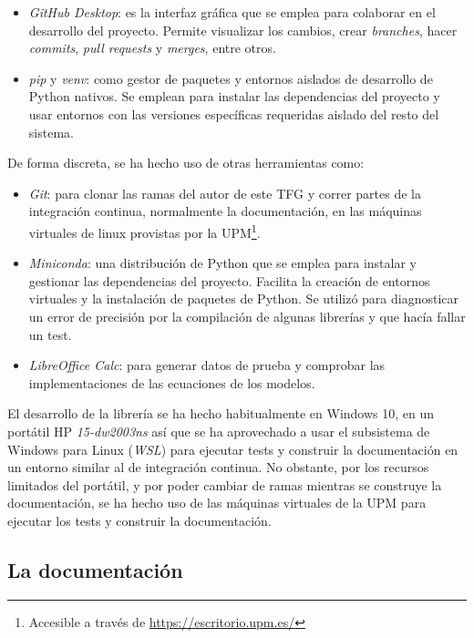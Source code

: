 \begin{itemize}
\begin{itemize}
          \end{itemize}

    \item \textit{GitHub Desktop}: es la interfaz gráfica que se emplea para colaborar en el desarrollo del proyecto. Permite visualizar los cambios, crear \textit{branches}, hacer \textit{commits}, \textit{pull requests} y \textit{merges}, entre otros.
    \item \textit{pip} y \textit{venv}: como gestor de paquetes y entornos aislados de desarrollo de Python nativos. Se emplean para instalar las dependencias del proyecto y usar entornos con las versiones específicas requeridas aislado del resto del sistema.


\end{itemize}

De forma discreta, se ha hecho uso de otras herramientas como:

\begin{itemize}
    \item \textit{Git}: para clonar las ramas del autor de este TFG y correr partes de la integración continua, normalmente la documentación, en las máquinas virtuales de linux provistas por la UPM\footnote{Accesible a través de \url{https://escritorio.upm.es/}}.
    \item \textit{Miniconda}: una distribución de Python que se emplea para instalar y gestionar las dependencias del proyecto. Facilita la creación de entornos virtuales y la instalación de paquetes de Python. Se utilizó para diagnosticar un error de precisión por la compilación de algunas librerías y que hacía fallar un test.
    \item \textit{LibreOffice Calc}: para generar datos de prueba y comprobar las implementaciones de las ecuaciones de los modelos.
\end{itemize}

El desarrollo de la librería se ha hecho habitualmente en Windows 10, en un portátil HP \textit{15-dw2003ns} así que se ha aprovechado a usar el subsistema de Windows para Linux (\textit{WSL}) para ejecutar tests y construir la documentación en un entorno similar al de integración continua. No obstante, por los recursos limitados del portátil, y por poder cambiar de ramas mientras se construye la documentación, se ha hecho uso de las máquinas virtuales de la UPM para ejecutar los tests y construir la documentación.

\subsection{La documentación}

